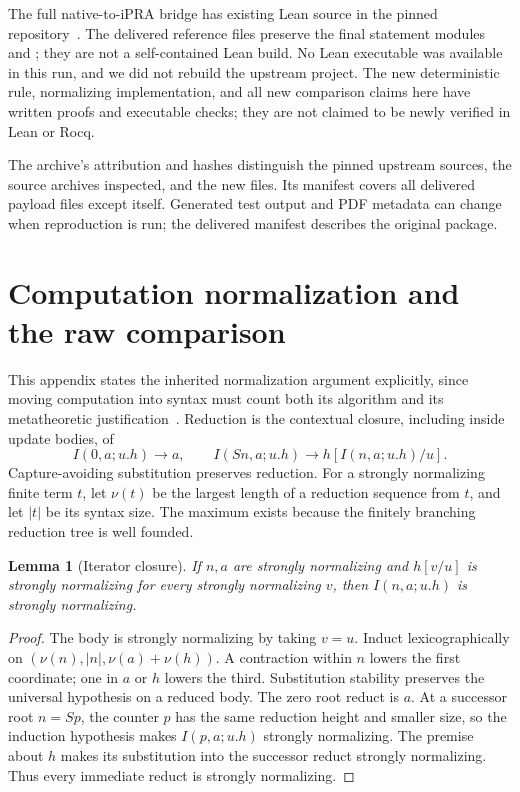 \documentclass[11pt,letterpaper]{article}
\newtheorem{lemma}[theorem]{Lemma}
\theoremstyle{definition}\newtheorem{definition}[theorem]{Definition}
\theoremstyle{remark}\newtheorem{remark}[theorem]{Remark}
\begin{document}
The full native-to-iPRA bridge has existing Lean source in the pinned
repository~\cite{lean}. The delivered reference files preserve the final
statement modules  and
; they are not a self-contained Lean build.
No Lean executable was available in this run, and we did not rebuild the
upstream project. The new deterministic rule, normalizing implementation,
and all new comparison claims here have written proofs and executable checks;
they are not claimed to be newly verified in Lean or Rocq.

The archive's attribution and hashes distinguish the pinned upstream sources,
the source archives inspected, and the new files. Its manifest covers all
delivered payload files except itself. Generated test output and PDF metadata
can change when reproduction is run; the delivered manifest describes the
original package.


\appendix


\section{Computation normalization and the raw comparison}
\label{sec:normalization}

This appendix states the inherited normalization argument explicitly, since
moving computation into syntax must count both its algorithm and its
metatheoretic justification~\cite{normalization,prior}. Reduction is the
contextual closure, including inside update bodies, of
\[
 I(0,a;u.h)\to a,\qquad I(Sn,a;u.h)\to h[I(n,a;u.h)/u].
\]
Capture-avoiding substitution preserves reduction. For a strongly normalizing
finite term $t$, let $\nu(t)$ be the largest length of a reduction sequence
from $t$, and let $|t|$ be its syntax size. The maximum exists because the
finitely branching reduction tree is well founded.

\begin{lemma}[Iterator closure]
If $n,a$ are strongly normalizing and $h[v/u]$ is strongly normalizing for
every strongly normalizing $v$, then $I(n,a;u.h)$ is strongly normalizing.
\end{lemma}
\begin{proof}
The body is strongly normalizing by taking $v=u$. Induct lexicographically
on $(\nu(n),|n|,\nu(a)+\nu(h))$. A contraction within $n$ lowers the first
coordinate; one in $a$ or $h$ lowers the third. Substitution stability
preserves the universal hypothesis on a reduced body. The zero root reduct
is $a$. At a successor root $n=Sp$, the counter $p$ has the same reduction
height and smaller size, so the induction hypothesis makes $I(p,a;u.h)$
strongly normalizing. The premise about $h$ makes its substitution into
the successor reduct strongly normalizing. Thus every immediate reduct is
strongly normalizing.
\end{proof}
\end{document}
